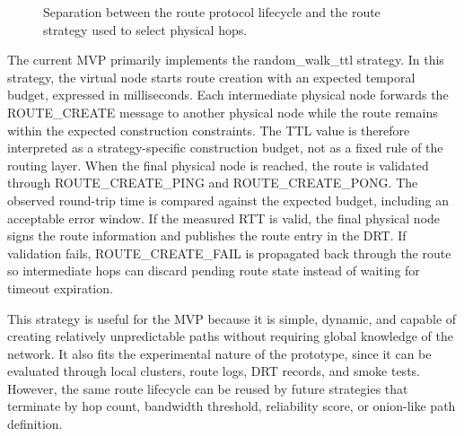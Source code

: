 \documentclass[12pt,a4paper]{article}
\newcommand{\codebreak}[1]{{\footnotesize\ttfamily #1}}
\begin{document}
\begin{figure}[H]
{%
}
\caption{Separation between the route protocol lifecycle and the route strategy used to select physical hops.}
\label{fig:route-strategy-abstraction}
\end{figure}

The current MVP primarily implements the \codebreak{random\_\allowbreak{}walk\_\allowbreak{}ttl} strategy. In this strategy, the virtual node starts route creation with an expected temporal budget, expressed in milliseconds. Each intermediate physical node forwards the \codebreak{ROUTE\_\allowbreak{}CREATE} message to another physical node while the route remains within the expected construction constraints. The TTL value is therefore interpreted as a strategy-specific construction budget, not as a fixed rule of the routing layer. When the final physical node is reached, the route is validated through \codebreak{ROUTE\_\allowbreak{}CREATE\_\allowbreak{}PING} and \codebreak{ROUTE\_\allowbreak{}CREATE\_\allowbreak{}PONG}. The observed round-trip time is compared against the expected budget, including an acceptable error window. If the measured RTT is valid, the final physical node signs the route information and publishes the route entry in the DRT. If validation fails, \codebreak{ROUTE\_\allowbreak{}CREATE\_\allowbreak{}FAIL} is propagated back through the route so intermediate hops can discard pending route state instead of waiting for timeout expiration.

This strategy is useful for the MVP because it is simple, dynamic, and capable of creating relatively unpredictable paths without requiring global knowledge of the network. It also fits the experimental nature of the prototype, since it can be evaluated through local clusters, route logs, DRT records, and smoke tests. However, the same route lifecycle can be reused by future strategies that terminate by hop count, bandwidth threshold, reliability score, or onion-like path definition.
\end{document}
